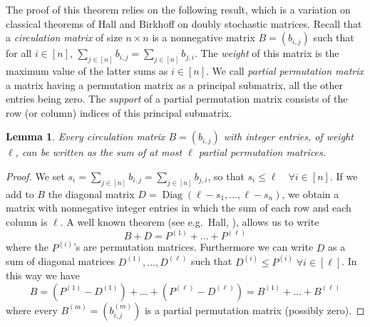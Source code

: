 \documentclass[a4paper]{amsart}
\theoremstyle{definition}
\theoremstyle{plain}
\newtheorem{lem}[thm]{Lemma}
\theoremstyle{remark}
\begin{document}
The proof of this theorem relies on the following result, which is
a variation on classical theorems of Hall and Birkhoff on doubly stochastic matrices. Recall that a {\em circulation matrix} of size $n\times n$ is a nonnegative matrix $B=(b_{i,j})$ such that for all $i\in [n]$, $\sum_{j\in[n]}b_{i,j}=\sum_{j\in [n]}b_{j,i}$. 
The {\em weight} of this matrix is the maximum value of the latter sums as $i\in [n]$. We call {\em partial permutation matrix} a matrix
having a permutation matrix as a principal submatrix, all the other entries
being zero.  The {\em support} of a partial permutation matrix consists of the row (or column) indices of this principal submatrix.
\begin{lem}\label{lem-circ}
Every circulation matrix $B=(b_{i,j})$ with integer entries, of weight $\ell$, can be written as the sum of at most $\ell$ partial permutation matrices.
\end{lem}
\begin{proof}
We set $s_i = \sum_{j\in[n]} b_{i,j} = \sum_{j\in [n]} b_{j,i}$,
so that $s_i {\leqslant} \ell \quad\forall i \in [n]$.
 If we add to $B$ the diagonal matrix $D=\operatorname{Diag}(\ell-s_1,\dots,\ell-s_n)$, we obtain a matrix with nonnegative integer entries
 in which the sum of each row and each column is $\ell$. 
A well known theorem (see e.g.\ Hall, {\cite[Theorem 5.1.9]{hall}}), allows us 
to write
 \[
 B+D = P^{(1)} + \dots + P^{(\ell)}
 \]
 where the $P^{(i)}$'s are permutation matrices.
 Furthermore we can write $D$ as a sum of diagonal matrices $D^{(1)}, \dots, D^{(\ell)}$ such that $D^{(i)} {\leqslant} P^{(i)} \;\forall i\in[\ell]$.
 In this way we have
 \[
 B = (P^{(1)}-D^{(1)}) + \dots + (P^{(\ell)}-D^{(\ell)}) = B^{(1)} + \dots + B^{(\ell)}
 \]
 where every $B^{(m)}=(b^{(m)}_{i,j})$ is a partial permutation matrix (possibly zero).
\end{proof}
\end{document}
